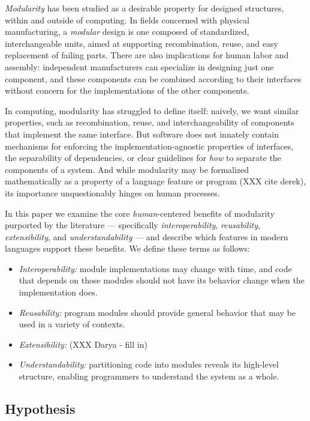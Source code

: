 \documentclass{sigplanconf}
\begin{document}
{\em Modularity} has been studied as a desirable property for designed
structures, within and outside of computing. In fields concerned with
physical manufacturing, a {\em modular} design is one composed of
standardized, interchangeable units, aimed at supporting recombination,
reuse, and easy replacement of failing parts. There are also implications
for human labor and assembly: independent manufacturers can specialize in
designing just one component, and these components can be combined
according to their interfaces without concern for the implementations of
the other components.  

In computing, modularity has struggled to define itself: naively, we want
similar properties, such as recombination, reuse, and interchangeability of
components that implement the same interface. But software does not
innately contain mechanisms for enforcing the implementation-agnostic
properties of interfaces, the separability of dependencies, or clear
guidelines for {\em how} to separate the components of a system.  And while
modularity may be formalized mathematically as a property of a language
feature or program (XXX cite derek), its importance unquestionably hinges
on human processes. 

In this paper we examine the core {\em human}-centered benefits of
modularity purported by the literature --- specifically {\em
interoperability}, {\em reusability}, {\em extensibility}, and 
{\em understandability} --- and describe which features in modern languages
support these benefits. 
We define these terms as follows:

\begin{itemize}
  \item {\em Interoperability:} module implementations may change with
    time, and code that depends on those modules should not have its
    behavior change when the implementation does.
  \item {\em Reusability:} program modules should provide general behavior
    that may be used in a variety of contexts.
  \item {\em Extensibility:} (XXX Darya - fill in)
  \item {\em Understandability:} partitioning code into modules reveals
    its high-level structure, enabling programmers to understand the system
    as a whole.
\end{itemize}

\subsection{Hypothesis}
\end{document}
